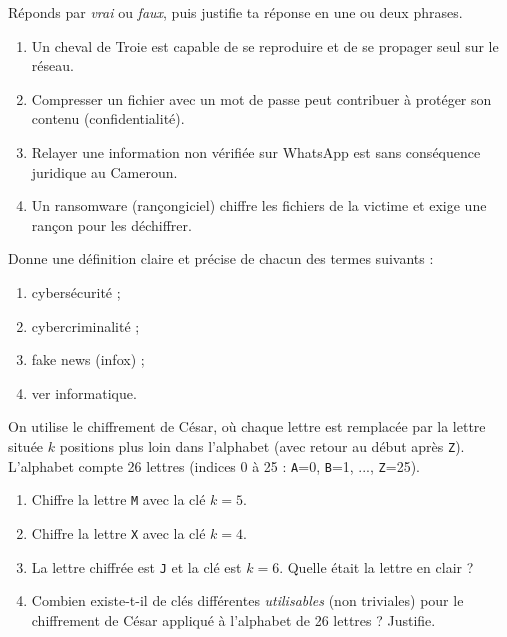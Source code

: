 \documentclass[11pt]{article}
\newcommand{\cle}[1]{{\popxbold\color{popdark}#1}}
\begin{document}
\begin{exercice}
Réponds par \emph{vrai} ou \emph{faux}, puis justifie ta réponse en une ou deux phrases.
\begin{enumerate}
\item Un \cle{cheval de Troie} est capable de se reproduire et de se propager seul sur le réseau.
\item Compresser un fichier avec un mot de passe peut contribuer à protéger son contenu (confidentialité).
\item Relayer une information non vérifiée sur WhatsApp est sans conséquence juridique au Cameroun.
\item Un \cle{ransomware} (rançongiciel) chiffre les fichiers de la victime et exige une rançon pour les déchiffrer.
\end{enumerate}
\end{exercice}

\begin{exercice}[Définitions]
Donne une définition claire et précise de chacun des termes suivants :
\begin{enumerate}
\item cybersécurité ;
\item cybercriminalité ;
\item fake news (infox) ;
\item ver informatique.
\end{enumerate}
\end{exercice}

\begin{exercice}
On utilise le chiffrement de César, où chaque lettre est remplacée par la lettre située $k$ positions plus loin dans l'alphabet (avec retour au début après \texttt{Z}). L'alphabet compte 26 lettres (indices 0 à 25 : \texttt{A}=0, \texttt{B}=1, ..., \texttt{Z}=25).
\begin{enumerate}
\item Chiffre la lettre \texttt{M} avec la clé $k = 5$.
\item Chiffre la lettre \texttt{X} avec la clé $k = 4$.
\item La lettre chiffrée est \texttt{J} et la clé est $k = 6$. Quelle était la lettre en clair ?
\item Combien existe-t-il de clés différentes \emph{utilisables} (non triviales) pour le chiffrement de César appliqué à l'alphabet de 26 lettres ? Justifie.
\end{enumerate}
\end{exercice}
\end{document}
